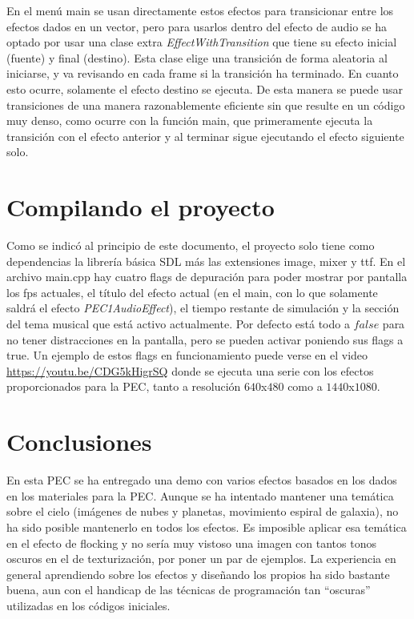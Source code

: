 \documentclass[12pt]{article}%
\begin{document}
	En el menú main se usan directamente estos efectos para transicionar entre los efectos dados en un vector, pero para usarlos dentro del efecto de audio se ha optado por usar una clase extra \textit{EffectWithTransition} que tiene su efecto inicial (fuente) y final (destino). Esta clase elige una transición de forma aleatoria al iniciarse, y va revisando en cada frame si la transición ha terminado. En cuanto esto ocurre, solamente el efecto destino se ejecuta. De esta manera se puede usar transiciones de una manera razonablemente eficiente sin que resulte en un código muy denso, como ocurre con la función main, que primeramente ejecuta la transición con el efecto anterior y al terminar sigue ejecutando el efecto siguiente solo.
	
\section{Compilando el proyecto}
	Como se indicó al principio de este documento, el proyecto solo tiene como dependencias la librería básica SDL más las extensiones image, mixer y ttf. En el archivo main.cpp hay cuatro flags de depuración para poder mostrar por pantalla los fps actuales, el título del efecto actual (en el main, con lo que solamente saldrá el efecto \textit{PEC1AudioEffect}), el tiempo restante de simulación y la sección del tema musical que está activo actualmente. Por defecto está todo a $false$ para no tener distracciones en la pantalla, pero se pueden activar poniendo sus flags a true. Un ejemplo de estos flags en funcionamiento puede verse en el video \url{https://youtu.be/CDG5kHigrSQ} donde se ejecuta una serie con los efectos proporcionados para la PEC, tanto a resolución $640$x$480$ como a $1440$x$1080$.
	
\section{Conclusiones}
	En esta PEC se ha entregado una demo con varios efectos basados en los dados en los materiales para la PEC. Aunque se ha intentado mantener una temática sobre el cielo (imágenes de nubes y planetas, movimiento espiral de galaxia), no ha sido posible mantenerlo en todos los efectos. Es imposible aplicar esa temática en el efecto de flocking y no sería muy vistoso una imagen con tantos tonos oscuros en el de texturización, por poner un par de ejemplos. La experiencia en general aprendiendo sobre los efectos y diseñando los propios ha sido bastante buena, aun con el handicap de las técnicas de programación tan ``oscuras'' utilizadas en los códigos iniciales.
	
\end{document}
